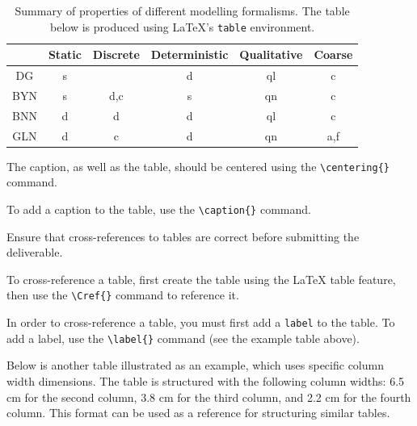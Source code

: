 \begin{table}[htb]
	\centering
	\caption{Summary of properties of different modelling formalisms. The table below is produced using \LaTeX's {\tt table} environment.}
	\label{tab:latextable}
     \def\arraystretch{1.25}
	\begin{tabular}{|c|c|c|c|c|c|}
		\hline
		\rowcolor{gray!30} %
		& Static & Discrete & Deterministic & Qualitative & Coarse \\ 
	    \hline
	    DG & s &  & d & ql & c \\ \hline
	    BYN & s & d,c & s & qn & c\\ \hline
	    BNN & d & d & d & ql & c\\ \hline
	    GLN & d & c & d & qn & a,f\\ \hline
	\end{tabular}
\end{table}

The caption, as well as the table, should be centered using the \texttt{\textbackslash centering\{\}} command.

To add a caption to the table, use the \texttt{\textbackslash caption\{\}} command. 

Ensure that cross-references to tables are correct before submitting the deliverable. 

To cross-reference a table, first create the table using the LaTeX table feature, then use the \texttt{\textbackslash Cref\{\}} command to reference it.

In order to cross-reference a table, you must first add a \texttt{label} to the table. To add a label, use the \texttt{\textbackslash label\{\}} command (see the example table above).


Below is another table illustrated as an example, which uses specific column width dimensions. The table is structured with the following column widths: 6.5 cm for the second column, 3.8 cm for the third column, and 2.2 cm for the fourth column. This format can be used as a reference for structuring similar tables.

